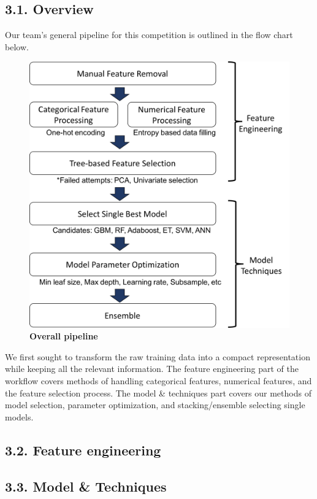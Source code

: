 \subsection*{3.1. Overview}
Our team's general pipeline for this competition is outlined in the flow chart below. \\
\begin{figure}[h]
\center
\includegraphics[scale=0.4]{figure1/figure1.png}
\caption{\textbf{Overall pipeline}}
\end{figure}

We first sought to transform the raw training data into a compact representation while keeping all the relevant information. The feature engineering part of the workflow covers methods of handling categorical features, numerical features, and the feature selection process. The model \& techniques part covers our methods of model selection, parameter 
optimization, and stacking/ensemble selecting single models. 

\subsection*{3.2. Feature engineering}


\newpage

\subsection*{3.3. Model \& Techniques}
